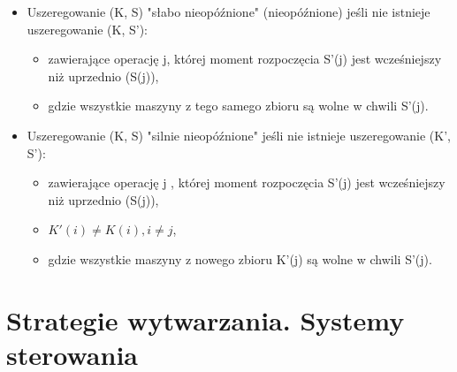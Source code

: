 \documentclass[10pt, a
4paper]{article}
\begin{document}
\begin{itemize}
\item Uszeregowanie (K, S) "słabo nieopóźnione" (nieopóźnione) jeśli nie istnieje uszeregowanie (K, S'):
\begin{itemize}
\item zawierające operację j, której moment rozpoczęcia S'(j) jest wcześniejszy niż uprzednio (S(j)),
\item gdzie wszystkie maszyny z tego samego zbioru są wolne w chwili S'(j).
\end{itemize}
\item Uszeregowanie (K, S) "silnie nieopóźnione" jeśli nie istnieje uszeregowanie (K', S'):
\begin{itemize}
\item zawierające operację j , której moment rozpoczęcia S'(j) jest wcześniejszy niż uprzednio (S(j)),
\item $K'(i) \neq K(i), i \neq j$,
\item gdzie wszystkie maszyny z nowego zbioru K'(j) są wolne w chwili S'(j).
\end{itemize}
\end{itemize}






\newpage
\section{Strategie wytwarzania. Systemy sterowania}
\end{document}
